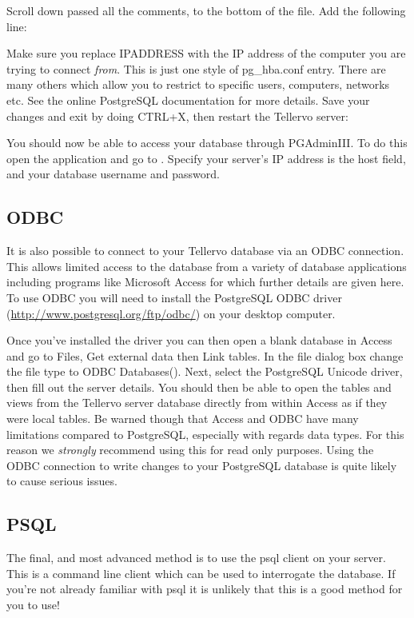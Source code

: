 
Scroll down passed all the comments, to the bottom of the file.  Add the following line:


Make sure you replace IPADDRESS with the IP address of the computer you are trying to connect \emph{from}. This is just one style of pg\_hba.conf entry.  There are many others which allow you to restrict to specific users, computers, networks etc.  See the online PostgreSQL documentation for more details.  Save your changes and exit by doing CTRL+X, then restart the Tellervo server:


You should now be able to access your database through PGAdminIII. To do this open the application and go to .  Specify your server's IP address is the host field, and your database username and password.


\subsection{ODBC}
It is also possible to connect to your Tellervo database via an ODBC connection.  This allows limited access to the database from a variety of database applications including programs like Microsoft Access for which further details are given here.   To use ODBC you will need to install the PostgreSQL ODBC driver (\url{http://www.postgresql.org/ftp/odbc/}) on your desktop computer.

Once you've installed the driver you can then open a blank database in Access and go to Files, Get external data then Link tables.  In the file dialog box change the file type to ODBC Databases().  Next, select the PostgreSQL Unicode driver, then fill out the server details.  You should then be able to open the tables and views from the Tellervo server database directly from within Access as if they were local tables.  Be warned though that Access and ODBC have many limitations compared to PostgreSQL, especially with regards data types.  For this reason we \emph{strongly} recommend using this for read only purposes.  Using the ODBC connection to write changes to your PostgreSQL database is quite likely to cause serious issues. 

\subsection{PSQL}
The final, and most advanced method is to use the psql client on your server.  This is a command line client which can be used to interrogate the database.  If you're not already familiar with psql it is unlikely that this is a good method for you to use!


